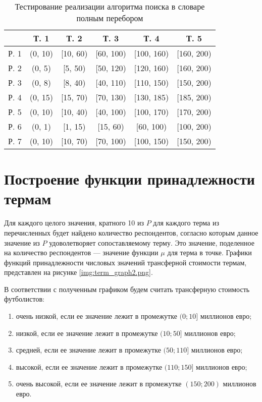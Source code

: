 \captionsetup{singlelinecheck = false, justification=raggedright}
\begin{center}
	\captionsetup{justification=raggedright,singlelinecheck=off}
	\begin{table}[ht]
		\centering
		\caption{Тестирование реализации алгоритма поиска в словаре полным перебором}
		\label{table:anket}
		\begin{tabular}{|c|c|c|c|c|c|}
			\hline
			   & Т. 1  	  & Т. 2 &  Т. 3 & Т. 4 & Т. 5\\ 
			\hline
			Р. 1 & (0, 10) & [10, 60) & [60, 100)   & [100, 160) & [160, 200)\\ \hline
			Р. 2 & (0, 5)  & [5, 50) & [50, 120)  & [120, 160) & [160, 200)\\ \hline
			Р. 3 & (0, 8) & [8, 40) & [40, 110) & [110, 150) & [150, 200)\\ \hline
			Р. 4 & (0, 15) & [15, 70) & [70, 130) & [130, 185) & [185, 200)\\ \hline
			Р. 5 & (0, 10) & [10, 40) & [40, 100) & [100, 170) & [170, 200)\\ \hline
                Р. 6 & (0, 1) & [1, 15) & [15, 60) & [60, 100) & [100, 200)\\ \hline
                Р. 7 & (0, 10) & [10, 70) & [70, 100) & [100, 150) & [150, 200)\\ \hline
		\end{tabular}
	\end{table}
\end{center}
\captionsetup{singlelinecheck = false, justification=centering}
\section{Построение функции принадлежности термам}

Для каждого целого значения, кратного 10 из $P$ для каждого терма из перечисленных будет найдено количество респондентов, согласно которым данное значение из $P$ удоволетворяет сопоставляемому терму.
Это значение, поделенное на количество респондентов --- значение функции $\mu$ для терма в точке.
Графики функций принадлежности числовых значений трансферной стоимости термам, представлен на рисунке \ref{img:term_graph2.png}.



В соответствии с полученным графиком будем считать трансферную стоимость футболистов:
\begin{enumerate}[label=\arabic*)]
	\item очень низкой, если ее значение лежит в промежутке $(0; 10]$ миллионов евро;
	\item низкой, если ее значение лежит в промежутке $(10; 50]$ миллионов евро;
	\item средней, если ее значение лежит в промежутке $(50; 110]$ миллионов евро;
	\item высокой, если ее значение лежит в промежутке $(110; 150]$ миллионов евро;
	\item очень высокой, если ее значение лежит в промежутке $(150; 200)$ миллионов евро.
\end{enumerate}

